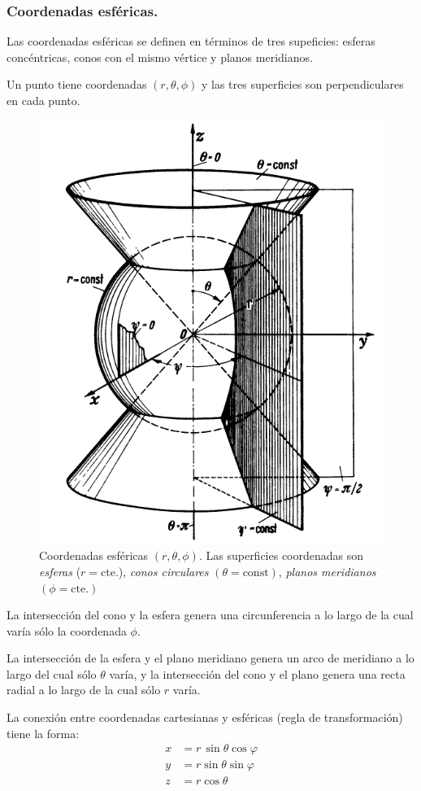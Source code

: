 \subsubsection*{Coordenadas esféricas.}
Las coordenadas esféricas se definen en términos de tres supeficies: esferas concéntricas, conos con el mismo vértice y planos meridianos.
\par
Un punto tiene coordenadas $(r, \theta, \phi)$ y las tres superficies son perpendiculares en cada punto.
\begin{figure}[H]
   \centering
   \includegraphics[scale=1.5]{Imagenes/Planos_Coordenadas_Esfericas.png}
   \caption{Coordenadas esféricas $(r, \theta, \phi)$. Las superficies coordenadas son \emph{esferas} ($r = \mbox{cte.}$), \emph{conos circulares} $(\theta = \mbox{const})$, \emph{planos meridianos} $(\phi = \mbox{cte.})$}
   \label{fig:figura_planos_esfericos}
\end{figure}
La intersección del cono y la esfera genera una circunferencia a lo largo de la cual varía sólo la coordenada $\phi$.
\par
La intersección de la esfera y el plano meridiano genera un arco de meridiano a lo largo del cual sólo $\theta$ varía, y la intersección del cono y el plano genera una recta radial a lo largo de la cual sólo $r$ varía.
\par
La conexión entre coordenadas cartesianas y esféricas (regla de transformación) tiene la forma:
\begin{align*}
x &= r \, \sin \theta \cos \varphi \\
y &= r \sin \theta \sin \varphi \\
z &= r \cos \theta
\end{align*}
